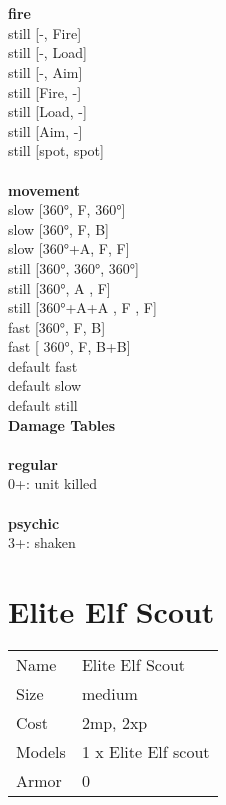  
\ \\



\ \\ {\bf fire } \\
still [-, Fire] \\
still [-, Load] \\
still [-, Aim] \\
still [Fire, -] \\
still [Load, -] \\
still [Aim, -] \\
still [spot, spot] \\
\ \\ {\bf movement } \\
slow [360°, F, 360°] \\
slow [360°, F, B] \\
slow [360°+A, F, F] \\
still [360°, 360°, 360°] \\
still [360°, A , F] \\
still [360°+A+A , F , F] \\
fast [360°, F, B] \\
fast [ 360°,  F, B+B] \\
default fast \\
default slow \\
default still \\


{\bf Damage Tables} \\
\ \\ {\bf regular } \\
0+: unit killed \\
\ \\ {\bf psychic } \\
3+: shaken \\










\pagebreak\pagebreak

\section{ Elite Elf Scout }

\begin{tabular}{ll}
  Name & Elite Elf Scout \\
  Size & medium\\
  Cost & 2mp, 2xp\\
  Models & 1 x Elite Elf scout\\
  Armor & 0\\
\end{tabular}


